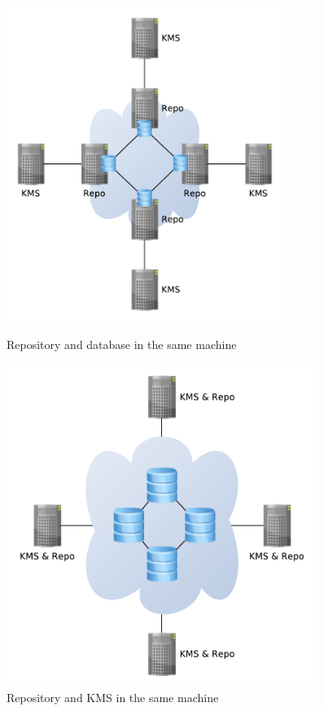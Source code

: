 \begin{figure}[!htb]
\centering
\begin{minipage}[b]{0.45\linewidth}
  \centering
  \includegraphics[width=0.8\textwidth]{figures/scale1.pdf}
  \caption{Repository and database in the same machine}
  \label{fig:scale1}
\end{minipage}
\quad
\begin{minipage}[b]{0.45\linewidth}
  \centering
  \includegraphics[width=0.9\textwidth]{figures/scale2.pdf}
  \caption{Repository and KMS in the same machine}
  \label{fig:scale2}
\end{minipage}
\end{figure}


